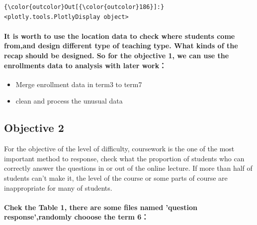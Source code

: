 \documentclass[11pt]{article}
\providecommand{\tightlist}{%
      \setlength{\itemsep}{0pt}\setlength{\parskip}{0pt}}
\begin{document}
\begin{Verbatim}[commandchars=\\\{\}]
{\color{outcolor}Out[{\color{outcolor}186}]:} <plotly.tools.PlotlyDisplay object>
\end{Verbatim}
            
    \paragraph{It is worth to use the location data to check where students
come from,and design different type of teaching type. What kinds of the
recap should be designed. So for the objective 1, we can use the
enrollments data to analysis with later
work：}\label{it-is-worth-to-use-the-location-data-to-check-where-students-come-fromand-design-different-type-of-teaching-type.-what-kinds-of-the-recap-should-be-designed.-so-for-the-objective-1-we-can-use-the-enrollments-data-to-analysis-with-later-work}

\begin{itemize}
\tightlist
\item
  Merge enrollment data in term3 to term7
\item
  clean and process the unusual data
\end{itemize}

    \subsection{Objective 2}\label{objective-2}

    For the objective of the level of difficulty, coursework is the one of
the most important method to response, check what the proportion of
students who can correctly answer the questions in or out of the online
lecture. If more than half of students can't make it, the level of the
course or some parts of course are inappropriate for many of students.

    \paragraph{Chek the Table 1, there are some files named 'question
response',randomly chooose the term
6：}\label{chek-the-table-1-there-are-some-files-named-question-responserandomly-chooose-the-term-6}
\end{document}
